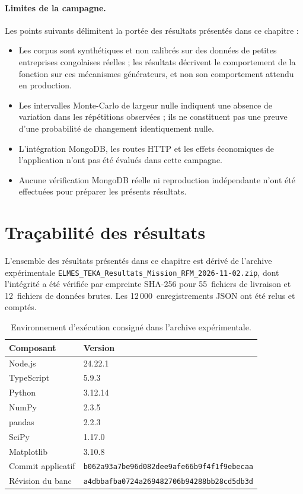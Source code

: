 \paragraph{Limites de la campagne.}
Les points suivants délimitent la portée des résultats présentés dans ce chapitre :

\begin{itemize}
  \item Les corpus sont synthétiques et non calibrés sur des données de petites entreprises
    congolaises réelles ; les résultats décrivent le comportement de la fonction sur ces
    mécanismes générateurs, et non son comportement attendu en production.
  \item Les intervalles Monte-Carlo de largeur nulle indiquent une absence de variation
    dans les répétitions observées ; ils ne constituent pas une preuve d'une probabilité
    de changement identiquement nulle.
  \item L'intégration MongoDB, les routes HTTP et les effets économiques de l'application
    n'ont pas été évalués dans cette campagne.
  \item Aucune vérification MongoDB réelle ni reproduction indépendante n'ont été effectuées
    pour préparer les présents résultats.
\end{itemize}

\section{Traçabilité des résultats}
\label{sec:resultats-tracabilite}

L'ensemble des résultats présentés dans ce chapitre est dérivé de l'archive expérimentale
\texttt{ELMES\_TEKA\_Resultats\_Mission\_RFM\_2026-11-02.zip}, dont l'intégrité a été
vérifiée par empreinte SHA-256 pour 55~fichiers de livraison et 12~fichiers de données
brutes. Les 12\,000~enregistrements JSON ont été relus et comptés.

\begin{table}[htb]
  \centering
  \caption{Environnement d'exécution consigné dans l'archive expérimentale.}
  \label{tab:resultats-versions}
  \begin{tabular}{ll}
    \toprule
    Composant & Version \\
    \midrule
    Node.js               & 24.22.1 \\
    TypeScript            & 5.9.3 \\
    Python                & 3.12.14 \\
    NumPy                 & 2.3.5 \\
    pandas                & 2.2.3 \\
    SciPy                 & 1.17.0 \\
    Matplotlib            & 3.10.8 \\
    Commit applicatif     & \texttt{\small b062a93a7be96d082dee9afe66b9f4f1f9ebecaa} \\
    Révision du banc      & \texttt{\small a4dbbafba0724a269482706b94288bb28cd5db3d} \\
    \bottomrule
  \end{tabular}
\end{table}

